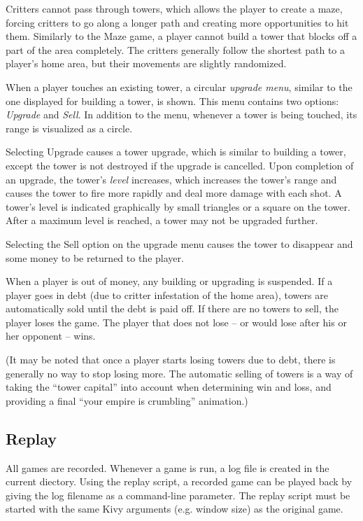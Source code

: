 \documentclass[a4paper,12pt]{article}
\begin{document}
Critters cannot pass through towers, which allows the player to create a maze,
forcing critters to go along a longer path and creating more
opportunities to hit them.
Similarly to the Maze game, a player cannot build a tower that blocks off a
part of the area completely.
The critters generally follow the shortest path to a player's home area,
but their movements are slightly randomized.

When a player touches an existing tower, a circular \emph{upgrade menu},
similar to the one displayed for building a tower, is shown.
This menu contains two options: \emph{Upgrade} and \emph{Sell}.
In addition to the menu, whenever a tower is being touched, its range
is visualized as a circle.

Selecting Upgrade causes a tower upgrade, which is similar to building a tower,
except the tower is not destroyed if the upgrade is cancelled.
Upon completion of an upgrade, the tower's \emph{level} increases, which
increases the tower's range and causes the tower to fire more rapidly and deal
more damage with each shot.
A tower's level is indicated graphically by small triangles or a square on the
tower.
After a maximum level is reached, a tower may not be upgraded further.

Selecting the Sell option on the upgrade menu causes the tower to disappear
and some money to be returned to the player.

When a player is out of money, any building or upgrading is suspended.
If a player goes in debt (due to critter infestation of the home area), towers
are automatically sold until the debt is paid off.
If there are no towers to sell, the player loses the game.
The player that does not lose – or would lose after his or her opponent – wins.

(It may be noted that once a player starts losing towers due to debt, there is
generally no way to stop losing more.
The automatic selling of towers is a way of taking the “tower capital” into
account when determining win and loss, and providing a final “your empire is
crumbling” animation.)


\subsection{Replay}

All games are recorded. Whenever a game is run, a log file is created in the
current diectory.
Using the replay script, a recorded game can be played back by giving the log
filename as a command-line parameter.
The replay script must be started with the same Kivy arguments (e.g. window
size) as the original game.
\end{document}
